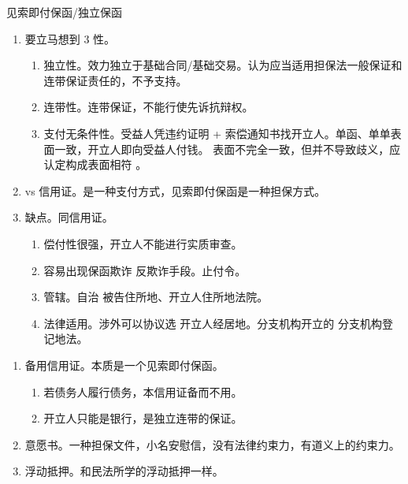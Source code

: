 \begin{enumerate}
\begin{kk}{见索即付保函/独立保函}
\begin{enumerate}
            \item 要立马想到 3 性。
                  \begin{enumerate}
                    \item 独立性。效力独立于基础合同/基础交易。认为应当适用担保法一般保证和连带保证责任的，不予支持。
                    \item 连带性。连带保证，不能行使先诉抗辩权。
                    \item 支付无条件性。受益人凭违约证明 + 索偿通知书找开立人。单函、单单表面一致，开立人即向受益人付钱。
                          表面不完全一致，但并不导致歧义，应认定构成表面相符 \dui。
                  \end{enumerate}
            \item vs 信用证。是一种支付方式，见索即付保函是一种担保方式。
            \item 缺点。同信用证。
                  \begin{enumerate}
                    \item 偿付性很强，开立人不能进行实质审查。
                    \item 容易出现保函欺诈 \yjt 反欺诈手段。止付令。
                    \item 管辖。自治 \yjt 被告住所地、开立人住所地法院。
                    \item 法律适用。涉外可以协议选 \yjt 开立人经居地。分支机构开立的 \yjt 分支机构登记地法。
                  \end{enumerate}
          \end{enumerate}
        \end{kk}
        \begin{enumerate}
          \item 备用信用证。本质是一个见索即付保函。
                \begin{enumerate}
                  \item 若债务人履行债务，本信用证备而不用。
                  \item 开立人只能是银行，是独立连带的保证。
                \end{enumerate}
          \item 意愿书。一种担保文件，小名安慰信，没有法律约束力，有道义上的约束力。
          \item 浮动抵押。和民法所学的浮动抵押一样。
        \end{enumerate}
\end{enumerate}
